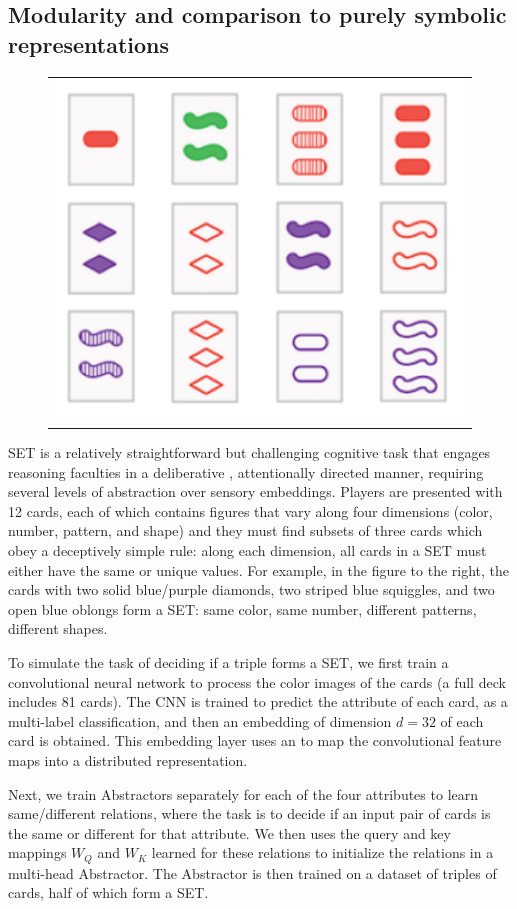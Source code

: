 \subsection{Modularity and comparison to purely symbolic representations}
\label{ssec:set_exp}


\begin{figure}
	\vskip-5pt
	\begin{tabular}{c}
		\includegraphics[width=.30\textwidth]{figures/set_example}\\[-20pt]
	\end{tabular}
\end{figure}
SET is a relatively straightforward but challenging cognitive task that engages reasoning faculties in a deliberative
, attentionally directed manner, requiring several levels of abstraction over sensory embeddings. Players are
presented with 12 cards, each of which contains figures that vary along four dimensions (color, number, pattern, and
shape) and they must find subsets of three cards which obey a deceptively simple rule: along each dimension, all cards in a SET must either have the same or unique values. For example, in the figure to the right, the cards with two solid blue/purple diamonds, two striped blue squiggles, and two open blue oblongs form a SET: same color, same number, different patterns, different shapes.

To simulate the task of deciding if a triple forms a SET, we first train a convolutional neural network to process the color images of the cards (a full deck includes 81 cards). The CNN is trained to predict the attribute of
each card, as a multi-label classification, and then an embedding of dimension $d=32$ of 
each card is obtained. This embedding layer uses an \MLP{} to map the convolutional feature maps into a distributed representation.

Next, we train Abstractors separately for each of the four attributes to learn same/different 
relations, where the task is to decide if an input pair of cards is the same or different for that attribute. 
We then uses the query and key mappings $W_Q$ and $W_K$ learned for these relations to initialize the relations
in a multi-head Abstractor. The Abstractor is then trained on a dataset of triples of cards, half of which form a SET. 

